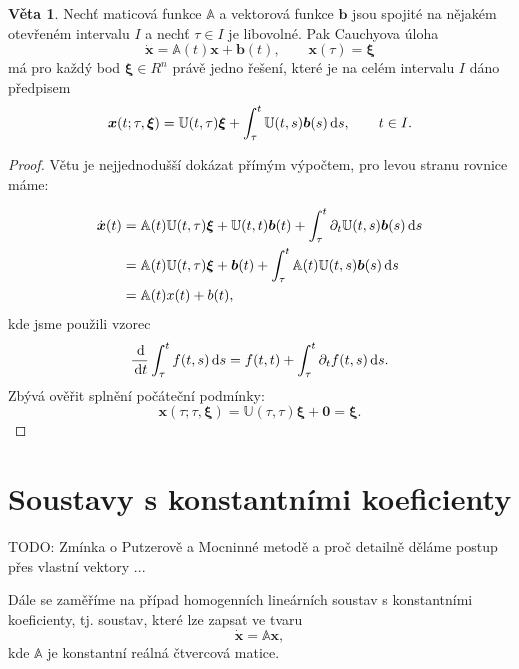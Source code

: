 \documentclass[a4paper, 12pt]{book}
\theoremstyle{definition}
\newtheorem{theorem}{Věta}[section]
\def\d{\,{\rm d}}               %
\def\vc#1{\mathbf{\boldsymbol{#1}}}     %
\def\tn#1{{\mathbb{#1}}}    %
\def\prtl{\partial}                                        %
\def\todo#1{{\color{green}TODO:} #1}
\begin{document}
\begin{theorem}
Nechť maticová funkce ${\tn A}$ a vektorová funkce $\vc b$ jsou spojité na 
nějakém otevřeném intervalu $I$ a nechť $\tau \in I$ je libovolné. Pak Cauchyova
úloha
\[
    \dot{\vc x} = {\tn A}(t)\vc x+\vc b(t),\qquad \vc x(\tau)=\vc\xi
\]
má pro každý bod $\vc\xi\in R^n$ právě jedno řešení, které je na celém intervalu 
$I$ dáno předpisem
\[
    \vc x(t;\tau,\vc\xi) = {\tn U}(t,\tau)\vc\xi+\int_\tau^t{\tn U}(t,s) \vc b(s)\d s,\qquad t\in I.
\]
\end{theorem}
\begin{proof}
Větu je nejjednodušší dokázat přímým výpočtem, pro levou stranu rovnice máme:

\begin{align*}
   \dot{\vc x}(t) &= \tn A(t) \tn U(t,\tau) \vc \xi +\tn U(t,t) \vc b(t) + \int_\tau^t \prtl_t{\tn U}(t,s) \vc b(s) \d s\\
                  &= \tn A(t) \tn U(t,\tau) \vc \xi + \vc b(t) + \int_\tau^t \tn A(t)\tn U(t,s) \vc b(s) \d s\\
                  &= \tn A(t) x(t) + b(t),
\end{align*}
kde jsme použili vzorec
\[ 
   \frac{\d}{\d t} \int_\tau^t f(t,s) \d s = f(t,t) + \int_\tau^t \prtl_t f(t,s) \d s.
\]
Zbývá ověřit splnění počáteční podmínky:
\[
   \vc x(\tau;\tau, \vc \xi) = {\tn U}(\tau, \tau) \vc \xi + \vc 0 = \vc \xi.
\]
\end{proof}



\section{Soustavy s konstantními koeficienty}
\label{konst_koef}

\todo{Zmínka o Putzerově a Mocninné metodě a proč detailně děláme postup přes vlastní vektory ...}

Dále se zaměříme na případ homogenních lineárních soustav s konstantními 
koeficienty, tj. soustav, které lze zapsat ve tvaru
\begin{equation}
    \label{eq:const_coef}
    \dot{\vc x} = {\tn A}\vc x,
\end{equation}
kde $\tn A$ je konstantní reálná čtvercová matice.
\end{document}
